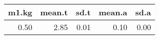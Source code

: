\begin{table}[ht]
\centering
\begin{tabular}{rrrrr}
  \hline
m1.kg & mean.t & sd.t & mean.a & sd.a \\ 
  \hline
0.50 & 2.85 & 0.01 & 0.10 & 0.00 \\ 
   \hline
\end{tabular}
\end{table}

